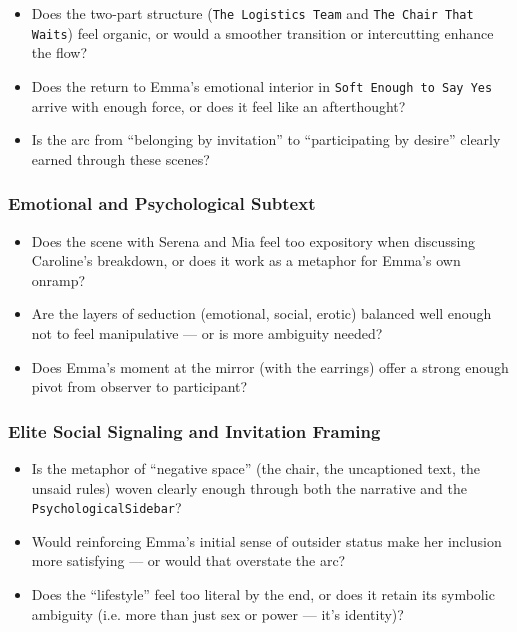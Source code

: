 \begin{itemize}
  \item Does the two-part structure (\texttt{The Logistics Team} and \texttt{The Chair That Waits}) feel organic, or would a smoother transition or intercutting enhance the flow?
  \item Does the return to Emma’s emotional interior in \texttt{Soft Enough to Say Yes} arrive with enough force, or does it feel like an afterthought?
  \item Is the arc from “belonging by invitation” to “participating by desire” clearly earned through these scenes?
\end{itemize}

\subsubsection*{Emotional and Psychological Subtext}

\begin{itemize}
  \item Does the scene with Serena and Mia feel too expository when discussing Caroline's breakdown, or does it work as a metaphor for Emma’s own onramp?
  \item Are the layers of seduction (emotional, social, erotic) balanced well enough not to feel manipulative — or is more ambiguity needed?
  \item Does Emma’s moment at the mirror (with the earrings) offer a strong enough pivot from observer to participant?
\end{itemize}

\subsubsection*{Elite Social Signaling and Invitation Framing}

\begin{itemize}
  \item Is the metaphor of “negative space” (the chair, the uncaptioned text, the unsaid rules) woven clearly enough through both the narrative and the \texttt{PsychologicalSidebar}?
  \item Would reinforcing Emma’s initial sense of outsider status make her inclusion more satisfying — or would that overstate the arc?
  \item Does the ``lifestyle'' feel too literal by the end, or does it retain its symbolic ambiguity (i.e. more than just sex or power — it’s identity)?
\end{itemize}

